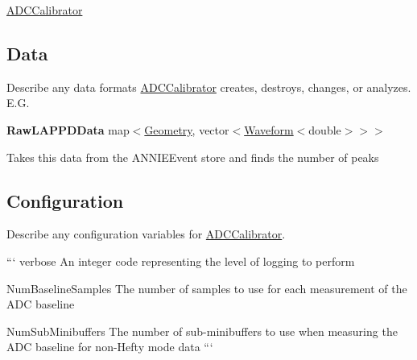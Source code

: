 \hyperlink{classADCCalibrator}{A\-D\-C\-Calibrator}

\subsection*{Data}

Describe any data formats \hyperlink{classADCCalibrator}{A\-D\-C\-Calibrator} creates, destroys, changes, or analyzes. E.\-G.

{\bfseries Raw\-L\-A\-P\-P\-D\-Data} {\ttfamily map$<$\hyperlink{classGeometry}{Geometry}, vector$<$\hyperlink{classWaveform}{Waveform}$<$double$>$$>$$>$}
\begin{DoxyItemize}
\item Takes this data from the {\ttfamily A\-N\-N\-I\-E\-Event} store and finds the number of peaks
\end{DoxyItemize}

\subsection*{Configuration}

Describe any configuration variables for \hyperlink{classADCCalibrator}{A\-D\-C\-Calibrator}.

``` verbose An integer code representing the level of logging to perform

Num\-Baseline\-Samples The number of samples to use for each measurement of the A\-D\-C baseline

Num\-Sub\-Minibuffers The number of sub-\/minibuffers to use when measuring the A\-D\-C baseline for non-\/\-Hefty mode data ``` 